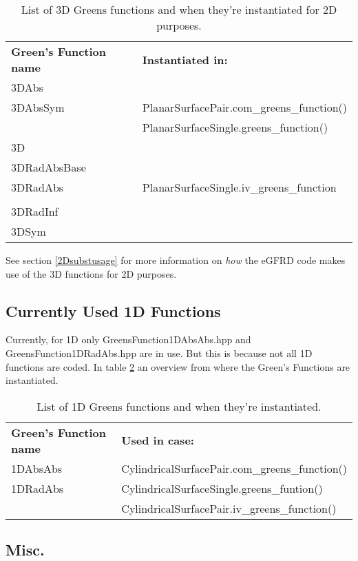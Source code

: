 \documentclass[a4paper,10pt]{article}
\begin{document}
\begin{table}[h!]
\caption{List of 3D Greens functions and when they're instantiated for 2D purposes.}
\label{3Dtablesubstinst}
\begin{tabular}{ p{} p{} }
  \textbf{Green's Function name} & \textbf{Instantiated in:} \\
3DAbs 		& \\
3DAbsSym 	& PlanarSurfacePair.com\_greens\_function()\\
		& PlanarSurfaceSingle.greens\_function()\\
3D 		& \\
3DRadAbsBase 	& \\
3DRadAbs	& PlanarSurfaceSingle.iv\_greens\_function\\
		& \\
3DRadInf 	& \\
3DSym 		& \\
\end{tabular}
\end{table}
 
See section \ref{2Dsubstusage} for more information on \textit{how} the eGFRD code makes use of the 3D functions for 2D purposes.

\subsection{Currently Used 1D Functions}

Currently, for 1D only GreensFunction1DAbsAbs.hpp and GreensFunction1DRadAbs.hpp are in use. But this is because not all 1D functions are coded. In table \ref{1Dtableinst} an overview from where the Green's Functions are instantiated.

\begin{table}[h!]
\caption{List of 1D Greens functions and when they're instantiated.}
\label{1Dtableinst}
\begin{tabular}{ p{} p{} }
  \textbf{Green's Function name} & \textbf{Used in case:} \\
1DAbsAbs	& CylindricalSurfacePair.com\_greens\_function()\\
1DRadAbs 	& CylindricalSurfaceSingle.greens\_funtion()\\
		& CylindricalSurfacePair.iv\_greens\_function()
\end{tabular}
\end{table}

\subsection{Misc.}
\end{document}
